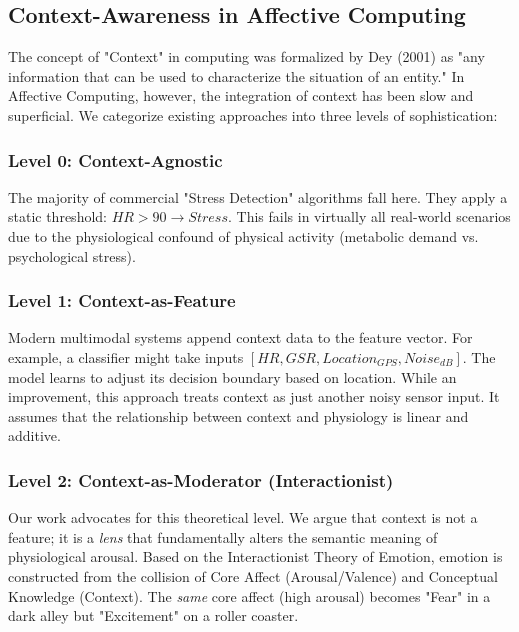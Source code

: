 \documentclass[journal]{IEEEtran}
\begin{document}
\subsection{Context-Awareness in Affective Computing}
The concept of "Context" in computing was formalized by Dey (2001) as "any information that can be used to characterize the situation of an entity."
In Affective Computing, however, the integration of context has been slow and superficial.
We categorize existing approaches into three levels of sophistication:

\subsubsection{Level 0: Context-Agnostic}
The majority of commercial "Stress Detection" algorithms fall here. They apply a static threshold: $HR > 90 \to Stress$.
This fails in virtually all real-world scenarios due to the physiological confound of physical activity (metabolic demand vs. psychological stress).

\subsubsection{Level 1: Context-as-Feature}
Modern multimodal systems append context data to the feature vector. For example, a classifier might take inputs $[HR, GSR, Location_{GPS}, Noise_{dB}]$.
The model learns to adjust its decision boundary based on location.
While an improvement, this approach treats context as just another noisy sensor input.
It assumes that the relationship between context and physiology is linear and additive.

\subsubsection{Level 2: Context-as-Moderator (Interactionist)}
Our work advocates for this theoretical level. We argue that context is not a feature; it is a \textit{lens} that fundamentally alters
the semantic meaning of physiological arousal.
Based on the Interactionist Theory of Emotion, emotion is constructed from the collision of Core Affect (Arousal/Valence) and Conceptual Knowledge (Context).
The \textit{same} core affect (high arousal) becomes "Fear" in a dark alley but "Excitement" on a roller coaster.
\end{document}
